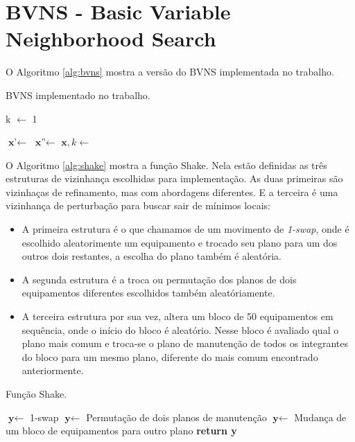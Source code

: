 \documentclass[
	12pt,				%
	oneside,			%
	a4paper,			%
	chapter=TITLE,
	sumario=tradicional,
	english,			%
	brazil				%
]{abntex2}
\begin{document}
\section{BVNS - Basic Variable Neighborhood Search}

O Algoritmo \ref{alg:bvns} mostra a versão do BVNS implementada 
no trabalho.

\begin{algorithm}[H]
	\caption{BVNS implementado no trabalho.}\label{alg:bvns}
	\begin{algorithmic}[1]
			\State k $\gets$ 1

				\State $ \textbf{x'} \gets$  
				\State $ \textbf{x''} \gets$  
				\State $ \textbf{x}, k \gets$  
			\EndWhile
		\EndWhile
	\EndProcedure 
	\end{algorithmic}
\end{algorithm}

O Algoritmo \ref{alg:shake} mostra a função Shake. Nela estão definidas as três estruturas de vizinhança escolhidas para implementação. As duas primeiras
são vizinhaças de refinamento, mas com abordagens diferentes. E a terceira é uma vizinhança de perturbação para buscar sair de mínimos locais:
\begin{itemize}
	\item A primeira estrutura é o que chamamos de um movimento de \textit{1-swap}, onde é escolhido aleatorimente um equipamento e trocado seu plano para um dos outros dois
	restantes, a escolha do plano também é aleatória.
	\item A segunda estrutura é a troca ou permutação dos planos de dois equipamentos diferentes escolhidos também aleatóriamente.
	\item A terceira estrutura por sua vez, altera um bloco de 50 equipamentos em sequência, onde o início do bloco é aleatório. Nesse bloco é avaliado qual o plano mais comum
	e troca-se o plano de manutenção de todos os integrantes do bloco para um mesmo plano, diferente do mais comum encontrado anteriormente.
\end{itemize}

\begin{algorithm}[H]
	\caption{Função Shake.}\label{alg:shake}
	\begin{algorithmic}[1]
			\State $\textbf{y} \gets$ 1-swap
		\EndIf
			\State $\textbf{y} \gets$ Permutação de dois planos de manutenção
		\EndIf
			\State $\textbf{y} \gets$ Mudança de um bloco de equipamentos para outro plano
		\EndIf
	\Statex
	\State \textbf{return y} 

	\EndProcedure 
	\end{algorithmic}
\end{algorithm}
\end{document}
